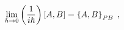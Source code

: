 \begin{equation}
\lim_{\hbar\rightarrow0}\left(  \frac{1}{i\hbar}\right)  \left[  A,B\right]
=\left\{  A,B\right\}  _{{\footnotesize PB}}\;,
\end{equation}

